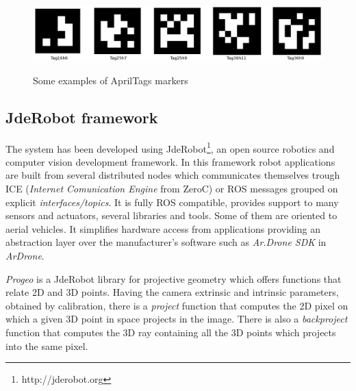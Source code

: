 \documentclass{styles/svproc}
\begin{document}
	\begin{figure}[h]
		\begin{center}
		{\includegraphics[width=\linewidth]{ejemplosapriltags.png}}
		\end{center}
		\caption{Some examples of AprilTags markers}
		\label{fig:apriltags}
	\end{figure}
	
\subsection{JdeRobot framework}

	The system has been developed using JdeRobot\footnote{http://jderobot.org}, an open source robotics and computer vision development framework.  In this framework robot applications are built from several distributed nodes which communicates themselves trough ICE (\textit{Internet Comunication Engine} from ZeroC) or ROS messages grouped on explicit \textit{interfaces/topics}. It is fully ROS compatible, provides support to many sensors and actuators, several libraries and tools. Some of them are oriented to aerial vehicles. It simplifies hardware access from applications providing an abstraction layer over the manufacturer's software such as \textit{Ar.Drone SDK} in \textit{ArDrone}.


 \textit{Progeo} is a JdeRobot library for projective geometry which offers functions that relate 2D and 3D points. Having the camera extrinsic and intrinsic parameters, obtained by calibration, there is a \textit{project} function that computes the 2D pixel on which a given 3D point in space projects in the image. There is also a \textit{backproject} function that computes the 3D ray containing all the 3D points which projects into the same pixel. 
\end{document}
